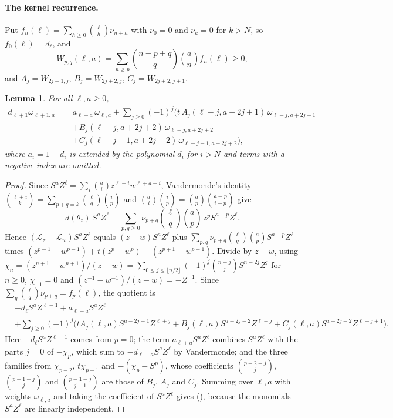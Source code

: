 \documentclass[twoside,10pt]{article}
\numberwithin{equation}{section}
\theoremstyle{slbody}
\newtheorem{lemma}[theorem]{Lemma}
\theoremstyle{definition}
\theoremstyle{remark}
\renewcommand{\eqref}[1]{\textup{{\normalfont(\oldstylenums{\ref{#1}}}\normalfont)}}
\begin{document}
\paragraph{The kernel recurrence.}
Put $f_n(\ell)=\sum_{h\geq0}\binom\ell h\nu_{n+h}$ with $\nu_0=0$ and $\nu_k=0$ for $k>N$, so $f_0(\ell)=d_\ell$, and
\[
W_{p,q}(\ell,a)=\sum_{n\geq p}\binom{n-p+q}q\binom an f_n(\ell)\geq0,
\]
and $A_j=W_{2j+1,j}$, $B_j=W_{2j+2,j}$, $C_j=W_{2j+2,j+1}$.

\begin{lemma}\label{lem:kernel-rec}
For all $\ell,a\geq0$,
\begin{equation}\label{eq:kernel-rec}
\begin{aligned}
d_{\ell+1}\omega_{\ell+1,a}={}&a_{\ell+a}\,\omega_{\ell,a}+\sum_{j\geq0}(-1)^j\Big(t\,A_j(\ell-j,a+2j+1)\,\omega_{\ell-j,a+2j+1}\\
&+B_j(\ell-j,a+2j+2)\,\omega_{\ell-j,a+2j+2}\\
&+C_j(\ell-j-1,a+2j+2)\,\omega_{\ell-j-1,a+2j+2}\Big),
\end{aligned}
\end{equation}
where $a_i=1-d_i$ is extended by the polynomial $d_i$ for $i>N$ and terms with a negative index are omitted.
\end{lemma}
\begin{proof}
Since $S^aZ^\ell=\sum_i\binom ai z^{\ell+i}w^{\ell+a-i}$, Vandermonde's identity $\binom{\ell+i}k=\sum_{p+q=k}\binom\ell q\binom ip$ and $\binom ai\binom ip=\binom ap\binom{a-p}{i-p}$ give
\[
d(\theta_z)\,S^aZ^\ell=\sum_{p,q\geq0}\nu_{p+q}\binom\ell q\binom ap\,z^pS^{a-p}Z^\ell .
\]
Hence $(\mathcal L_z-\mathcal L_w)S^aZ^\ell$ equals $(z-w)S^aZ^\ell$ plus $\sum_{p,q}\nu_{p+q}\binom\ell q\binom ap S^{a-p}Z^\ell$ times $(z^{p-1}-w^{p-1})+t(z^p-w^p)-(z^{p+1}-w^{p+1})$. Divide by $z-w$, using $\chi_n=(z^{n+1}-w^{n+1})/(z-w)=\sum_{0\leq j\leq\lfloor n/2\rfloor}(-1)^j\binom{n-j}jS^{n-2j}Z^j$ for $n\geq0$, $\chi_{-1}=0$ and $(z^{-1}-w^{-1})/(z-w)=-Z^{-1}$. Since $\sum_q\binom\ell q\nu_{p+q}=f_p(\ell)$, the quotient is
\[
\begin{aligned}
&-d_\ell S^aZ^{\ell-1}+a_{\ell+a}S^aZ^\ell\\
&+\sum_{j\geq0}(-1)^j\Big(tA_j(\ell,a)S^{a-2j-1}Z^{\ell+j}+B_j(\ell,a)S^{a-2j-2}Z^{\ell+j}+C_j(\ell,a)S^{a-2j-2}Z^{\ell+j+1}\Big).
\end{aligned}
\]
Here $-d_\ell S^aZ^{\ell-1}$ comes from $p=0$; the term $a_{\ell+a}S^aZ^\ell$ combines $S^aZ^\ell$ with the parts $j=0$ of $-\chi_p$, which sum to $-d_{\ell+a}S^aZ^\ell$ by Vandermonde; and the three families from $\chi_{p-2}$, $t\chi_{p-1}$ and $-(\chi_p-S^p)$, whose coefficients $\binom{p-2-j}j$, $\binom{p-1-j}j$ and $\binom{p-1-j}{j+1}$ are those of $B_j$, $A_j$ and $C_j$. Summing over $\ell,a$ with weights $\omega_{\ell,a}$ and taking the coefficient of $S^aZ^\ell$ gives \eqref{eq:kernel-rec}, because the monomials $S^aZ^\ell$ are linearly independent.
\end{proof}
\end{document}
